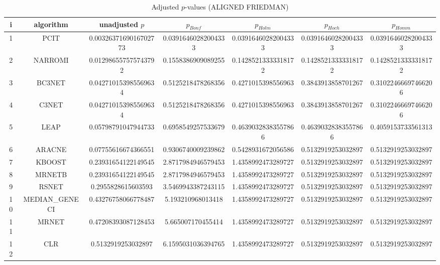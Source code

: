 \documentclass[a4paper,10pt]{article}
\begin{document}
\begin{landscape}
\begin{table}[!htp]
\centering\scriptsize
\caption{Adjusted $p$-values (ALIGNED FRIEDMAN)}
\begin{tabular}{ccccccc}
i&algorithm&unadjusted $p$&$p_{Bonf}$&$p_{Holm}$&$p_{Hoch}$&$p_{Homm}$\\
\hline
1&PCIT&0.0032637169016702773&0.03916460282004333&0.03916460282004333&0.03916460282004333&0.03916460282004333\\
2&NARROMI&0.012986557575743792&0.1558386909089255&0.14285213333318172&0.14285213333318172&0.14285213333318172\\
3&BC3NET&0.042710153985569634&0.5125218478268356&0.4271015398556963&0.3843913858701267&0.31022466697466206\\
4&C3NET&0.042710153985569634&0.5125218478268356&0.4271015398556963&0.3843913858701267&0.31022466697466206\\
5&LEAP&0.05798791047944733&0.6958549257533679&0.46390328383557866&0.46390328383557866&0.4059153733561313\\
6&ARACNE&0.07755616674366551&0.9306740009239862&0.5428931672056586&0.5132919253032897&0.5132919253032897\\
7&KBOOST&0.23931654122149545&2.8717984946579453&1.4358992473289727&0.5132919253032897&0.5132919253032897\\
8&MRNETB&0.23931654122149545&2.8717984946579453&1.4358992473289727&0.5132919253032897&0.5132919253032897\\
9&RSNET&0.2955828615603593&3.5469943387243115&1.4358992473289727&0.5132919253032897&0.5132919253032897\\
10&MEDIAN_GENECI&0.43276758066778487&5.193210968013418&1.4358992473289727&0.5132919253032897&0.5132919253032897\\
11&MRNET&0.47208393087128453&5.665007170455414&1.4358992473289727&0.5132919253032897&0.5132919253032897\\
12&CLR&0.5132919253032897&6.1595031036394765&1.4358992473289727&0.5132919253032897&0.5132919253032897\\
\hline
\end{tabular}
\end{table}


\end{landscape}
\end{document}
